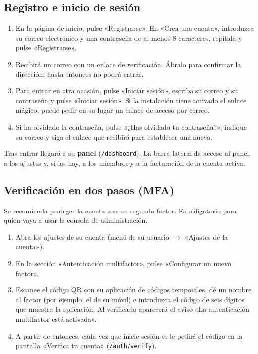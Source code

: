 \subsection{Registro e inicio de sesión}
\label{sec:ug-registro}

\begin{enumerate}
  \item En la página de inicio, pulse «Registrarse». En «Crea una cuenta»,
        introduzca su correo electrónico y una contraseña de al menos 8
        caracteres, repítala y pulse «Registrarse».
  \item Recibirá un correo con un enlace de verificación. Ábralo para
        confirmar la dirección; hasta entonces no podrá entrar.
  \item Para entrar en otra ocasión, pulse «Iniciar sesión», escriba su correo
        y su contraseña y pulse «Iniciar sesión». Si la instalación tiene
        activado el enlace mágico, puede pedir en su lugar un enlace de acceso
        por correo.
  \item Si ha olvidado la contraseña, pulse «¿Has olvidado tu contraseña?»,
        indique su correo y siga el enlace que recibirá para establecer una
        nueva.
\end{enumerate}

Tras entrar llegará a su \textbf{panel} (\texttt{/dashboard}). La barra
lateral da acceso al panel, a los ajustes y, si los hay, a los miembros y a la
facturación de la cuenta activa.

\subsection{Verificación en dos pasos (MFA)}
\label{sec:ug-mfa}

Se recomienda proteger la cuenta con un segundo factor. Es obligatorio para
quien vaya a usar la consola de administración.

\begin{enumerate}
  \item Abra los ajustes de su cuenta (menú de su usuario $\rightarrow$
        «Ajustes de la cuenta»).
  \item En la sección «Autenticación multifactor», pulse «Configurar un nuevo
        factor».
  \item Escanee el código QR con su aplicación de códigos temporales, dé un
        nombre al factor (por ejemplo, el de su móvil) e introduzca el código
        de seis dígitos que muestra la aplicación. Al verificarlo aparecerá el
        aviso «La autenticación multifactor está activada».
  \item A partir de entonces, cada vez que inicie sesión se le pedirá el
        código en la pantalla «Verifica tu cuenta» (\texttt{/auth/verify}).
\end{enumerate}

